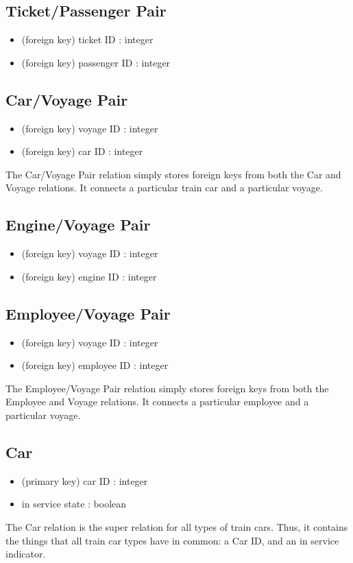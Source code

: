 \documentclass[a4paper]{article}
\begin{document}
\subsection*{Ticket/Passenger Pair}
\begin{itemize}
\item (foreign key) ticket ID : integer
\item (foreign key) passenger ID : integer
\end{itemize}
	
\subsection*{Car/Voyage Pair}
\begin{itemize}
\item (foreign key) voyage ID : integer
\item (foreign key) car ID : integer
\end{itemize}
The Car/Voyage Pair relation simply stores foreign keys from both the Car and Voyage relations. It connects a particular train car and a particular voyage.

\subsection*{Engine/Voyage Pair}
\begin{itemize}
\item (foreign key) voyage ID : integer
\item (foreign key) engine ID : integer
\end{itemize}

\subsection*{Employee/Voyage Pair}
\begin{itemize}
\item (foreign key) voyage ID : integer
\item (foreign key) employee ID : integer
\end{itemize}
The Employee/Voyage Pair relation simply stores foreign keys from both the Employee and Voyage relations. It connects a particular employee and a particular voyage.

\subsection*{Car}
\begin{itemize}
\item (primary key) car ID : integer
\item in service state : boolean
\end{itemize}
The Car relation is the super relation for all types of train cars. Thus, it contains the things that all train car types have in common: a Car ID, and an in service indicator.
\end{document}
